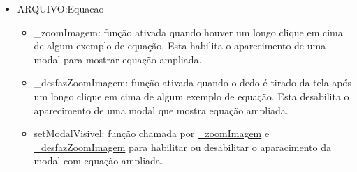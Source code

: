 \begin{itemize}
	\item ARQUIVO:Equacao

	\begin{itemize}

		\item \_zoomImagem: função ativada quando houver um longo clique em cima de algum exemplo de equação. Esta habilita o aparecimento de uma modal para mostrar equação ampliada.

		\item \_desfazZoomImagem: função ativada quando o dedo é tirado da tela após um longo clique em cima de algum exemplo de equação. Esta desabilita o aparecimento de uma modal que mostra equação ampliada.

		\item setModalVisivel: função chamada por \hyperref[_zoomImagem]{\_zoomImagem} e \hyperref[_desfazZoomImagem]{\_desfazZoomImagem} para habilitar ou desabilitar o aparacimento da modal com equação ampliada.
	
	\end{itemize}
	
\end{itemize}

